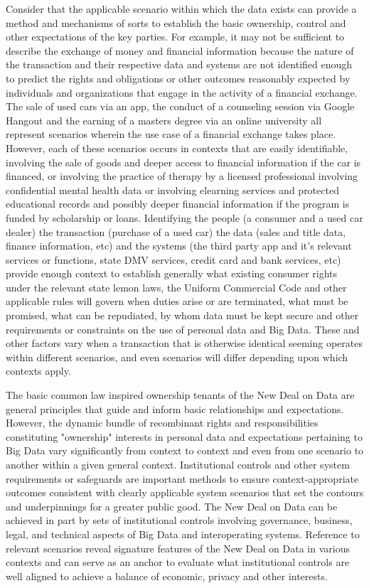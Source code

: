 Consider that the applicable scenario within which the data exists can provide a method and mechanisms of sorts to establish the basic ownership, control and other expectations of the key parties.  For example, it may not be sufficient to describe the exchange of money and financial information because the nature of the transaction and their respective data and systems are not identified enough to predict the rights and obligations or other outcomes reasonably expected by individuals and organizations that engage in the activity of a financial exchange.  The sale of used cars via an app, the conduct of a counseling session via Google Hangout and the earning of a masters degree via an online university all represent scenarios wherein the use case of a financial exchange takes place.  However, each of these scenarios occurs in contexts that are easily identifiable, involving the sale of goods and deeper access to financial information if the car is financed, or involving the practice of therapy by a licensed professional involving confidential mental health data or involving elearning services and protected educational records and possibly deeper financial information if the program is funded by scholarship or loans.  Identifying the people (a consumer and a used car dealer) the transaction (purchase of a used car) the data (sales and title data, finance information, etc) and the systems (the third party app and it's relevant services or functions, state DMV services, credit card and bank services, etc) provide enough context to establish generally what existing consumer rights under the relevant state lemon laws, the Uniform Commercial Code and other applicable rules will govern when duties arise or are terminated, what must be promised, what can be repudiated, by whom data must be kept secure and other requirements or constraints on the use of personal data and Big Data. These and other factors vary when a transaction that is otherwise identical seeming operates within different scenarios, and even scenarios will differ depending upon which contexts apply.  

The basic common law inspired ownership tenants of the New Deal on Data are general principles that guide and inform basic relationships and expectations.  However, the dynamic bundle of recombinant rights and responsibilities constituting "ownership" interests in personal data and expectations pertaining to Big Data vary significantly from context to context and even from one scenario to another within a given general context.  Institutional controls and other system requirements or safeguards are important methods to ensure context-appropriate outcomes consistent with clearly applicable system scenarios that set the contours and underpinnings for a greater public good.  The New Deal on Data can be achieved in part by sets of institutional controls involving governance, business, legal, and technical aspects of Big Data and interoperating systems.  Reference to relevant scenarios reveal signature features of the New Deal on Data in various contexts and can serve as an anchor to evaluate what institutional controls are well aligned to achieve a balance of economic, privacy and other interests. 

